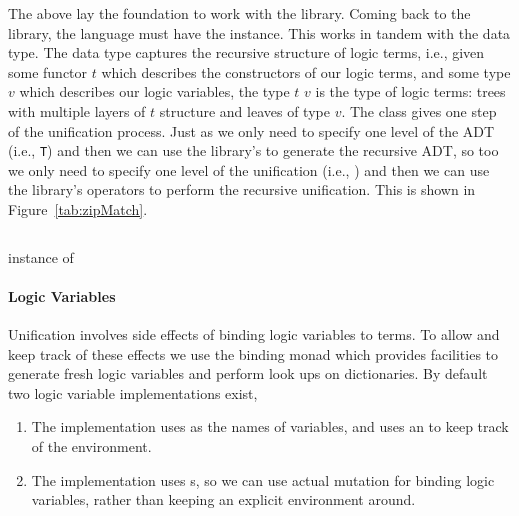 \documentclass[thesis-solanki.tex]{subfiles}
\begin{document}
The above lay the foundation to work with the library.
Coming back to the library, the language must have the  instance.
This works in tandem with the  data type.
The  data type captures the recursive structure of logic terms, i.e., given
some functor \(t\) which describes the 
constructors of our logic terms, and some type \(v\) which describes our logic variables, the type
 \(t\) \(v\) is the
type of logic terms: trees with multiple layers of \(t\) structure and leaves of type \(v\).
The  class gives one step of the unification process.
Just as we only need to specify one level of the ADT (i.e., \Verb!T!) and then we can use the library's  to generate
the recursive ADT, so too we only need to specify one level of the unification (i.e., ) and then we can use
the library's operators to perform the recursive unification.
This is shown in Figure~\ref{tab:zipMatch}.
\begin{code-list}[H]
  \begin{singlespace}
    \inputminted[linenos]{haskell}{haskell-proto1-zip-flat.hs}
  \end{singlespace}
  \vspace*{-0.5\baselineskip}
  \caption{\protect{} instance of \protect{}}
  \label{tab:zipMatch}
\end{code-list}

\paragraph{Logic Variables}
Unification involves side effects of binding logic variables to terms. To allow and keep track of these effects we use the binding monad
which provides facilities to generate fresh logic variables and perform look ups on dictionaries. By default two logic variable
implementations exist,

\begin{enumerate}
\item The  implementation uses  as the names of variables, and uses an
   to keep track of the environment. 

\item The  implementation uses s, so we can use actual mutation for binding logic
  variables, rather than keeping an explicit environment around.

\end{enumerate}
\end{document}
